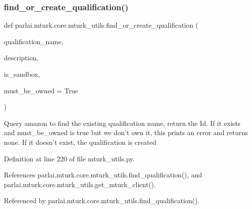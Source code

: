 \subsubsection{\texorpdfstring{find\+\_\+or\+\_\+create\+\_\+qualification()}{find\_or\_create\_qualification()}}
{\footnotesize\ttfamily def parlai.\+mturk.\+core.\+mturk\+\_\+utils.\+find\+\_\+or\+\_\+create\+\_\+qualification (\begin{DoxyParamCaption}\item[{}]{qualification\+\_\+name,  }\item[{}]{description,  }\item[{}]{is\+\_\+sandbox,  }\item[{}]{must\+\_\+be\+\_\+owned = {\ttfamily True} }\end{DoxyParamCaption})}

\begin{DoxyVerb}Query amazon to find the existing qualification name, return the Id. If
it exists and must_be_owned is true but we don't own it, this prints an
error and returns none. If it doesn't exist, the qualification is created
\end{DoxyVerb}
 

Definition at line 220 of file mturk\+\_\+utils.\+py.



References parlai.\+mturk.\+core.\+mturk\+\_\+utils.\+find\+\_\+qualification(), and parlai.\+mturk.\+core.\+mturk\+\_\+utils.\+get\+\_\+mturk\+\_\+client().



Referenced by parlai.\+mturk.\+core.\+mturk\+\_\+utils.\+find\+\_\+qualification().

